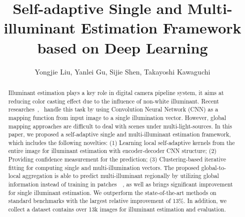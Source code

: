 \documentclass[10pt,twocolumn,letterpaper]{article}
\begin{document}
\title{Self-adaptive Single and Multi-illuminant Estimation Framework \\
based on Deep Learning}

\author{Yongjie Liu, Yanlei Gu, Sijie Shen, Takayoshi Kawaguchi
}


\maketitle

\begin{abstract}
  Illuminant estimation plays a key role in digital camera pipeline system,
  it aims at reducing color casting effect due to the influence of non-white illuminant.
  Recent researches~\cite{shi2016deep},~\cite{hu2017fc} handle this task by
  using Convolution Neural Network (CNN) as a mapping function from input image to a single illumination vector.
  However, global mapping approaches are difficult to deal with scenes under multi-light-sources.
  In this paper, we proposed a self-adaptive single and multi-illuminant estimation framework,
  which includes the following novelties:
  (1) Learning local self-adaptive kernels from the entire image for illuminant estimation with encoder-decoder CNN structure;
  (2) Providing confidence measurement for the prediction;
  (3) Clustering-based iterative fitting for computing single and multi-illumination vectors.
  The proposed global-to-local aggregation is able to predict multi-illuminant regionally by utilizing
  global information instead of training in patches~\cite{bianco2015single}~\cite{gijsenij2012color},
  as well as brings significant improvement for single illuminant estimation.
  We outperform the state-of-the-art methods on standard benchmarks with the largest relative improvement of 13\%.
  In addition, we collect a dataset contains over 13k images for illuminant estimation and evaluation.
\end{abstract}
\end{document}
